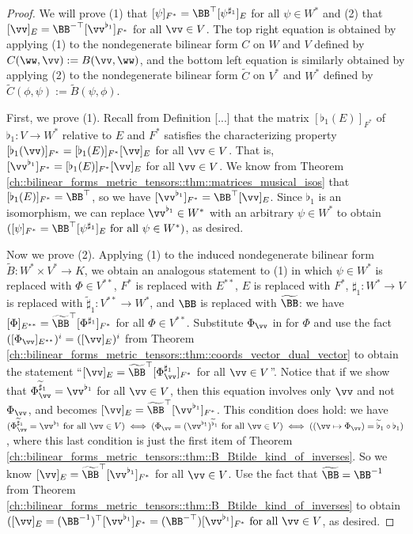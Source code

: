 \begin{proof}
    We will prove (1) that $[\psi]_{F^*} = \BB^\top [\psi^{\sharp_1}]_E$ for all $\psi \in W^*$ and (2) that $[\vv]_E = \BB^{-\top} [\vv^{\flat_1}]_{F^*}$ for all $\vv \in V$. The top right equation is obtained by applying (1) to the nondegenerate bilinear form $C$ on $W$ and $V$ defined by $C(\ww, \vv) := B(\vv, \ww)$, and the bottom left equation is similarly obtained by applying (2) to the nondegenerate bilinear form $\widetilde{C}$ on $V^*$ and $W^*$ defined by $\widetilde{C}(\phi, \psi) := \widetilde{B}(\psi, \phi)$.

    First, we prove (1). Recall from Definition [...] that the matrix $[\flat_1(E)]_{F^*}$ of $\flat_1:V \rightarrow W^*$ relative to $E$ and $F^*$ satisfies the characterizing property $[\flat_1(\vv)]_{F^*} = [\flat_1(E)]_{F^*} [\vv]_E$ for all $\vv \in V$. That is, $[\vv^{\flat_1}]_{F^*} = [\flat_1(E)]_{F^*} [\vv]_E$ for all $\vv \in V$. We know from Theorem \ref{ch::bilinear_forms_metric_tensors::thm::matrices_musical_isos} that $[\flat_1(E)]_{F^*} = \BB^\top$, so we have $[\vv^{\flat_1}]_{F^*} = \BB^\top [\vv]_E$. Since $\flat_1$ is an isomorphism, we can replace $\vv^{\flat_1} \in W^*$ with an arbitrary $\psi \in W^*$ to obtain $([\psi]_{F^*} = \BB^\top [\psi^{\sharp_1}]_E \text{ for all } \psi \in W^*)$, as desired.
    
    Now we prove (2). Applying (1) to the induced nondegenerate bilinear form $\widetilde{B}:W^* \times V^* \rightarrow K$, we obtain an analogous statement to (1) in which $\psi \in W^*$ is replaced with $\Phi \in V^{**}$, $F^*$ is replaced with $E^{**}$, $E$ is replaced with $F^*$, $\sharp_1:W^* \rightarrow V$ is replaced with $\widetilde{\sharp}_1:V^{**} \rightarrow W^*$, and $\BB$ is replaced with $\widetilde{\BB}$: we have $[\Phi]_{E^{**}} = \widetilde{\BB}^\top [\Phi^{\sharp_1}]_{F^*}$ for all $\Phi \in V^{**}$. Substitute $\Phi_\vv$ in for $\Phi$ and use the fact $([\Phi_\vv]_{E^{**}})^i = ([\vv]_E)^i$ from Theorem \ref{ch::bilinear_forms_metric_tensors::thm::coords_vector_dual_vector} to obtain the statement ``$[\vv]_E = \widetilde{\BB}^\top [\Phi_\vv^{\sharp_1}]_{F^*}$ for all $\vv \in V$''. Notice that if we show that $\Phi_\vv^{\widetilde{\sharp}_1} = \vv^{\flat_1}$ for all $\vv \in V$, then this equation involves only $\vv$ and not $\Phi_\vv$, and becomes $[\vv]_E = \widetilde{\BB}^\top [\vv^{\flat_1}]_{F^*}$. This condition does hold: we have $(\Phi_\vv^{\widetilde{\sharp}_1} = \vv^{\flat_1} \text{ for all } \vv \in V) \iff (\Phi_\vv = (\vv^{\flat_1})^{\widetilde{\flat}_1} \text{ for all } \vv \in V) \iff ((\vv \mapsto \Phi_\vv) = \widetilde{\flat}_1 \circ \flat_1)$, where this last condition is just the first item of Theorem \ref{ch::bilinear_forms_metric_tensors::thm::B_Btilde_kind_of_inverses}. So we know $[\vv]_E = \widetilde{\BB}^\top [\vv^{\flat_1}]_{F^*}$ for all $\vv \in V$. Use the fact that $\widetilde{\BB} = \BB^{-1}$ from Theorem \ref{ch::bilinear_forms_metric_tensors::thm::B_Btilde_kind_of_inverses} to obtain $([\vv]_E = (\BB^{-1})^\top [\vv^{\flat_1}]_{F^*} = (\BB^{-\top}) [\vv^{\flat_1}]_{F^*} \text{ for all $\vv \in V$}$, as desired.
\end{proof}

